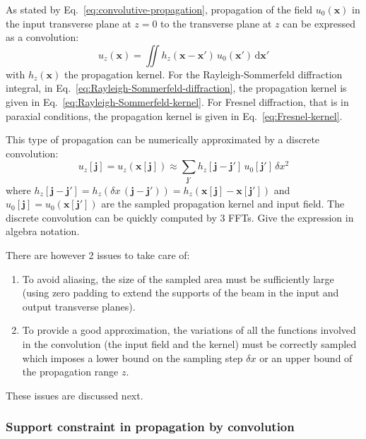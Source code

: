 \documentclass[a4paper]{article}
\newcommand{\oops}[1]{{\color{purple}#1}}
\newcommand{\V}[1]{\boldsymbol{#1}}
\newcommand*{\mathd}{\mathrm{d}}
\begin{document}
As stated by Eq.~\eqref{eq:convolutive-propagation}, propagation of the field
$u_{0}(\V{x})$ in the input transverse plane at $z=0$ to the transverse plane
at $z$ can be expressed as a convolution:
\begin{equation}
  u_{z}(\V{x}) =
  \iint h_{z}(\V{x} - \V{x}')\, u_{0}(\V{x}')\,\mathd\V{x}'
\end{equation}
with $h_{z}(\V{x})$ the propagation kernel. For the Rayleigh-Sommerfeld
diffraction integral, in Eq.~\eqref{eq:Rayleigh-Sommerfeld-diffraction}, the
propagation kernel is given in Eq.~\eqref{eq:Rayleigh-Sommerfeld-kernel}. For
Fresnel diffraction, that is in paraxial conditions, the propagation kernel is
given in Eq.~\eqref{eq:Fresnel-kernel}.

This type of propagation can be numerically approximated by a discrete
convolution:
\begin{equation}
  \label{eq:discrete-convolution}
  u_{z}[\V{j}] = u_{z}(\V{x}[\V{j}])
  \approx \sum_{\V{j}'}h_{z}[\V{j} - \V{j}']\,u_{0}[\V{j}']\,δx^{2}
\end{equation}
where
$h_{z}[\V{j} - \V{j}'] = h_{z}(δx\,(\V{j} - \V{j}')) = h_{z}(\V{x}[\V{j}] - \V{x}[\V{j}'])$
and $u_{0}[\V{j}] = u_{0}(\V{x}[\V{j}'])$ are the sampled propagation kernel
and input field. The discrete convolution can be quickly computed by 3 FFTs.
\oops{Give the expression in algebra notation.}

There are however 2 issues to take care of:
\begin{enumerate}
\item To avoid aliasing, the size of the sampled area must be sufficiently
      large (using zero padding to extend the supports of the beam in the input
      and output transverse planes).
\item To provide a good approximation, the variations of all the functions
      involved in the convolution (the input field and the kernel) must be
      correctly sampled which imposes a lower bound on the sampling step $δx$
      or an upper bound of the propagation range $z$.
\end{enumerate}

These issues are discussed next.

\subsubsection{Support constraint in propagation by convolution}
\end{document}
